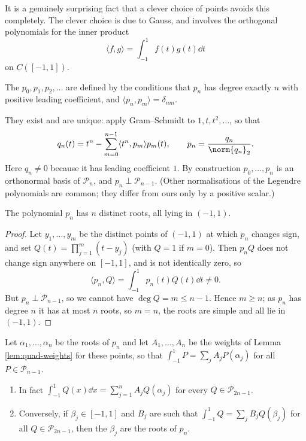 \documentclass[a4paper]{scrartcl}
\newcommand{\Pn}{\mathcal{P}}
\begin{document}
It is a genuinely surprising fact that a clever choice of points avoids this completely. The clever choice is due to Gauss, and involves the orthogonal polynomials for the inner product
$$\langle f,g\rangle = \int_{-1}^1 f(t)g(t)\dd t$$
on $C([-1,1])$.

\begin{definition}
	The  $p_0,p_1,p_2,\ldots$ are defined by the conditions that $p_n$ has degree exactly $n$ with positive leading coefficient, and $\langle p_n,p_m\rangle = \delta_{nm}$.
\end{definition}

They exist and are unique: apply Gram--Schmidt to $1,t,t^2,\ldots$, so that
$$q_n(t) = t^n - \sum_{m=0}^{n-1}\langle t^n,p_m\rangle p_m(t), \qquad p_n = \frac{q_n}{\norm{q_n}_2}.$$
Here $q_n\neq0$ because it has leading coefficient $1$. By construction $p_0,\ldots,p_n$ is an orthonormal basis of $\Pn_n$, and $p_n\perp \Pn_{n-1}$. (Other normalisations of the Legendre polynomials are common; they differ from ours only by a positive scalar.)

\begin{lemma}\label{lem:legendre-roots}
	The polynomial $p_n$ has $n$ distinct roots, all lying in $(-1,1)$.
\end{lemma}

\begin{proof}
	Let $y_1,\ldots,y_m$ be the distinct points of $(-1,1)$ at which $p_n$ changes sign, and set $Q(t) = \prod_{j=1}^m(t-y_j)$ (with $Q=1$ if $m=0$). Then $p_nQ$ does not change sign anywhere on $[-1,1]$, and is not identically zero, so
	$$\langle p_n, Q\rangle = \int_{-1}^1 p_n(t)Q(t)\dd t \neq 0.$$
	But $p_n\perp\Pn_{n-1}$, so we cannot have $\deg Q = m \leq n-1$. Hence $m \geq n$; as $p_n$ has degree $n$ it has at most $n$ roots, so $m=n$, the roots are simple and all lie in $(-1,1)$.
\end{proof}

\begin{theorem}\label{thm:gauss-quad}
	Let $\alpha_1,\ldots,\alpha_n$ be the roots of $p_n$ and let $A_1,\ldots,A_n$ be the weights of Lemma \ref{lem:quad-weights} for these points, so that $\int_{-1}^1 P = \sum_j A_jP(\alpha_j)$ for all $P \in \Pn_{n-1}$.
	\begin{enumerate}[label=(\roman*)]
		\item In fact $\int_{-1}^1 Q(x)\dd x = \sum_{j=1}^nA_jQ(\alpha_j)$ for every $Q\in\Pn_{2n-1}$.
		\item Conversely, if $\beta_j\in[-1,1]$ and $B_j$ are such that $\int_{-1}^1 Q = \sum_j B_jQ(\beta_j)$ for all $Q\in\Pn_{2n-1}$, then the $\beta_j$ are the roots of $p_n$.
	\end{enumerate}
\end{theorem}
\end{document}
